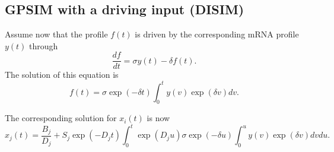 \documentclass{article}
\begin{document}
\subsection{GPSIM with a driving input (DISIM)}

Assume now that the profile $f(t)$ is driven by the corresponding mRNA
profile $y(t)$ through
\begin{equation}
  \label{eq:gpsim_f_ode}
  \frac{df}{dt} = \sigma y(t) - \delta f(t).
\end{equation}
The solution of this equation is
\begin{equation}
  \label{eq:gpsim_f_ode_sol}
  f(t) = \sigma \exp(-\delta t) \int_0^t y(v) \exp(\delta v) dv.
\end{equation}

The corresponding solution for $x_i(t)$ is now
\begin{equation}
  \label{eq:gpsim_f_x_sol}
  x_j(t) = \frac{B_j}{D_j} + S_j \exp(-D_j t) \int_0^t \exp(D_j
  u) \sigma \exp(-\delta u) \int_0^u y(v) \exp(\delta v) dv du.
\end{equation}
\end{document}
